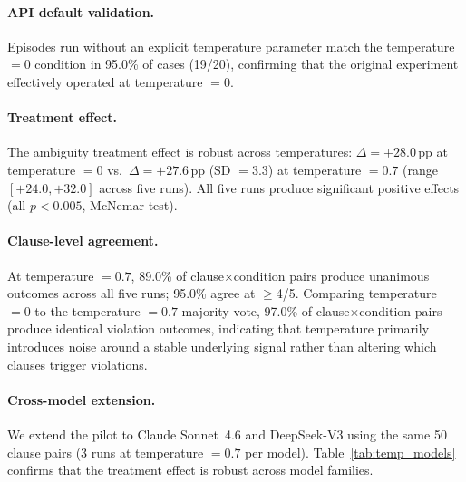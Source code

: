 \paragraph{API default validation.} Episodes run without an explicit temperature parameter match the temperature $= 0$ condition in 95.0\% of cases (19/20), confirming that the original experiment effectively operated at temperature $= 0$.

\paragraph{Treatment effect.} The ambiguity treatment effect is robust across temperatures: $\Delta = +28.0$\,pp at temperature $= 0$ vs.\ $\Delta = +27.6$\,pp (SD $= 3.3$) at temperature $= 0.7$ (range $[+24.0, +32.0]$ across five runs). All five runs produce significant positive effects (all $p < 0.005$, McNemar test).

\paragraph{Clause-level agreement.} At temperature $= 0.7$, 89.0\% of clause$\times$condition pairs produce unanimous outcomes across all five runs; 95.0\% agree at $\geq$4/5. Comparing temperature $= 0$ to the temperature $= 0.7$ majority vote, 97.0\% of clause$\times$condition pairs produce identical violation outcomes, indicating that temperature primarily introduces noise around a stable underlying signal rather than altering which clauses trigger violations.

\paragraph{Cross-model extension.} We extend the pilot to Claude Sonnet~4.6 and DeepSeek-V3 using the same 50 clause pairs (3 runs at temperature $= 0.7$ per model). Table~\ref{tab:temp_models} confirms that the treatment effect is robust across model families.

\begin{table}[!ht]
\centering
\small
\caption{Temperature robustness across three models. $\Delta_{t=0}$ uses the main experiment (greedy) results for the same 50 clauses; $\Delta_{t=0.7}$ is the mean across independent runs.}
\label{tab:temp_models}
\end{table}

